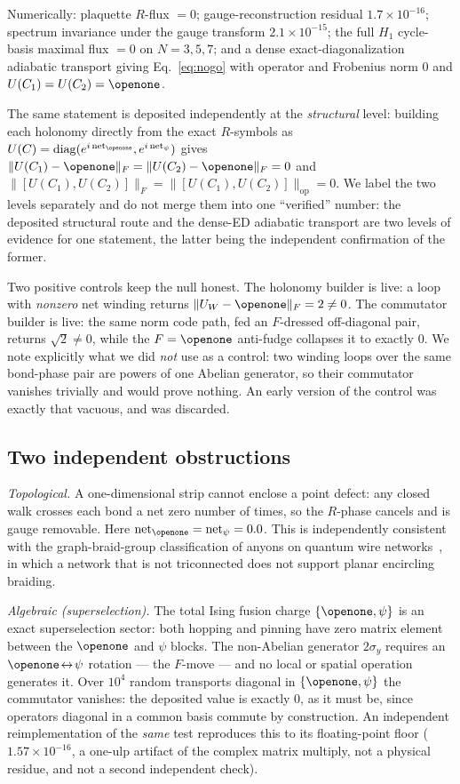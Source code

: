 \documentclass[aps,pra,twocolumn,superscriptaddress,longbibliography,floatfix,nofootinbib]{revtex4-2}
\newcommand{\Id}{\openone}
\newcommand{\Fnorm}[1]{\lVert #1 \rVert_{F}}
\newcommand{\Opnorm}[1]{\lVert #1 \rVert_{\mathrm{op}}}
\begin{document}
Numerically: plaquette $R$-flux $=0$; gauge-reconstruction residual
$1.7\times10^{-16}$; spectrum invariance under the gauge transform
$2.1\times10^{-15}$; the full $H_1$ cycle-basis maximal flux $=0$ on
$N=3,5,7$; and a dense exact-diagonalization adiabatic transport giving
Eq.~\eqref{eq:nogo} with operator and Frobenius norm $0$ and
$U(C_1)=U(C_2)=\Id$.

The same statement is deposited independently at the \emph{structural} level:
building each holonomy directly from the exact $R$-symbols as
$U(C)=\mathrm{diag}(e^{i\,\mathrm{net}_{\Id}},e^{i\,\mathrm{net}_{\psi}})$
gives $\Fnorm{U(C_1)-\Id} = \Fnorm{U(C_2)-\Id} = 0$ and
$\Fnorm{[U(C_1),U(C_2)]} = \Opnorm{[U(C_1),U(C_2)]} = 0$. We label the two
levels separately and do not merge them into one ``verified'' number: the
deposited structural route and the dense-ED adiabatic transport are two levels
of evidence for one statement, the latter being the independent confirmation of
the former.

Two positive controls keep the null honest. The holonomy builder is live: a
loop with \emph{nonzero} net winding returns $\Fnorm{U_W-\Id}=2\ne0$. The
commutator builder is live: the same norm code path, fed an $F$-dressed
off-diagonal pair, returns $\sqrt2\ne0$, while the $F=\Id$ anti-fudge collapses
it to exactly $0$. We note explicitly what we did \emph{not} use as a control:
two winding loops over the same bond-phase pair are powers of one Abelian
generator, so their commutator vanishes trivially and would prove nothing. An
early version of the control was exactly that vacuous, and was discarded.

\subsection{Two independent obstructions}
\label{sec:obstructions}

\emph{Topological.} A one-dimensional strip cannot enclose a point defect: any
closed walk crosses each bond a net zero number of times, so the $R$-phase
cancels and is gauge removable. Here
$\mathrm{net}_{\Id}=\mathrm{net}_{\psi}=0.0$. This is independently consistent
with the graph-braid-group classification of anyons on quantum wire
networks~\cite{ConlonSlingerland2022,Maciazek2023}, in which a network that is
not triconnected does not support planar encircling braiding.

\emph{Algebraic (superselection).} The total Ising fusion charge
$\{\Id,\psi\}$ is an exact superselection sector: both hopping and pinning have
zero matrix element between the $\Id$ and $\psi$ blocks. The non-Abelian
generator $2\sigma_y$ requires an $\Id\!\leftrightarrow\!\psi$ rotation --- the
$F$-move --- and no local or spatial operation generates it. Over $10^{4}$
random transports diagonal in $\{\Id,\psi\}$ the commutator vanishes: the
deposited value is exactly $0$, as it must be, since operators diagonal in a
common basis commute by construction. An independent reimplementation of the
\emph{same} test reproduces this to its floating-point floor
($1.57\times10^{-16}$, a one-ulp artifact of the complex matrix multiply, not a
physical residue, and not a second independent check).
\end{document}
